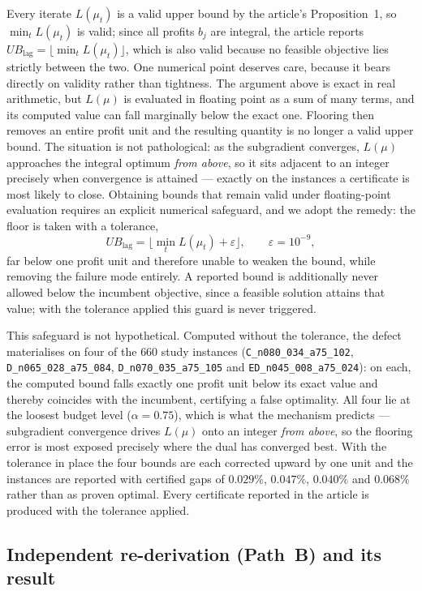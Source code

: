 \documentclass[11pt]{article}
\begin{document}
Every iterate $L(\mu_t)$ is a valid upper bound by the article's Proposition~1,
so $\min_t L(\mu_t)$ is valid; since all profits $b_j$ are integral, the article
reports $UB_{\text{lag}}=\lfloor\min_t L(\mu_t)\rfloor$, which is also valid
because no feasible objective lies strictly between the two. One numerical point
deserves care, because it bears directly on validity rather than tightness. The
argument above is exact in real arithmetic, but $L(\mu)$ is evaluated in
floating point as a sum of many terms, and its computed value can fall
marginally below the exact one. Flooring then removes an entire profit unit and
the resulting quantity is no longer a valid upper bound. The situation is not
pathological: as the subgradient converges, $L(\mu)$ approaches the integral
optimum \emph{from above}, so it sits adjacent to an integer precisely when
convergence is attained --- exactly on the instances a certificate is most
likely to close. Obtaining bounds that remain valid under floating-point
evaluation requires an explicit numerical safeguard, and we adopt the remedy: the floor is
taken with a tolerance,
\[
UB_{\text{lag}} = \bigl\lfloor \min_t L(\mu_t) + \varepsilon \bigr\rfloor,
\qquad \varepsilon = 10^{-9},
\]
far below one profit unit and therefore unable to weaken the bound, while
removing the failure mode entirely. A reported bound is additionally never
allowed below the incumbent objective, since a feasible solution attains that
value; with the tolerance applied this guard is never triggered.

This safeguard is not hypothetical. Computed without the tolerance, the defect
materialises on four of the $660$ study instances
(\texttt{C\_n080\_034\_a75\_102}, \texttt{D\_n065\_028\_a75\_084},
\texttt{D\_n070\_035\_a75\_105} and \texttt{ED\_n045\_008\_a75\_024}): on each,
the computed bound falls exactly one profit unit below its exact value and
thereby coincides with the incumbent, certifying a false optimality. All four
lie at the loosest budget level ($\alpha=0.75$), which is what the mechanism
predicts --- subgradient convergence drives $L(\mu)$ onto an integer \emph{from
above}, so the flooring error is most exposed precisely where the dual has
converged best. With the tolerance in place the four bounds are each corrected
upward by one unit and the instances are reported with certified gaps of
$0.029\%$, $0.047\%$, $0.040\%$ and $0.068\%$ rather than as proven optimal.
Every certificate reported in the article is produced with the tolerance
applied.

\subsection{Independent re-derivation (Path~B) and its result}
\end{document}
